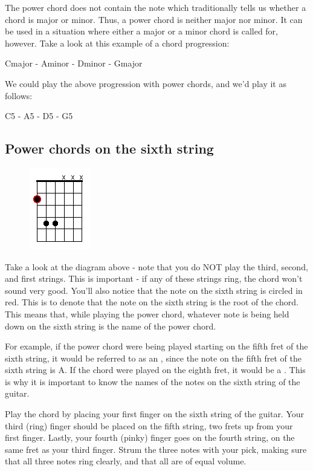 The power chord does not contain the note which traditionally tells us whether
a chord is major or minor. Thus, a power chord is neither major nor minor. It
can be used in a situation where either a major or a minor chord is called for,
however. Take a look at this example of a chord progression:

Cmajor - Aminor - Dminor - Gmajor

We could play the above progression with power chords, and we'd play it as follows:

C5 - A5 - D5 - G5

\subsection{Power chords on the sixth string}
\begin{figure}
\includegraphics{partfour/powerchord6.png}
\end{figure}

Take a look at the diagram above - note that you do NOT play the third, second,
and first strings. This is important - if any of these strings ring, the chord
won't sound very good. You'll also notice that the note on the sixth string is
circled in red. This is to denote that the note on the sixth string is the root
of the chord. This means that, while playing the power chord, whatever note is
being held down on the sixth string is the name of the power chord.

For example, if the power chord were being played starting on the fifth fret of
the sixth string, it would be referred to as an , since the note
on the fifth fret of the sixth string is A. If the chord were played on the
eighth fret, it would be a . This is why it is important to know
the names of the notes on the sixth string of the guitar.

Play the chord by placing your first finger on the sixth string of the guitar.
Your third (ring) finger should be placed on the fifth string, two frets up
from your first finger. Lastly, your fourth (pinky) finger goes on the fourth
string, on the same fret as your third finger. Strum the three notes with your
pick, making sure that all three notes ring clearly, and that all are of equal
volume.

